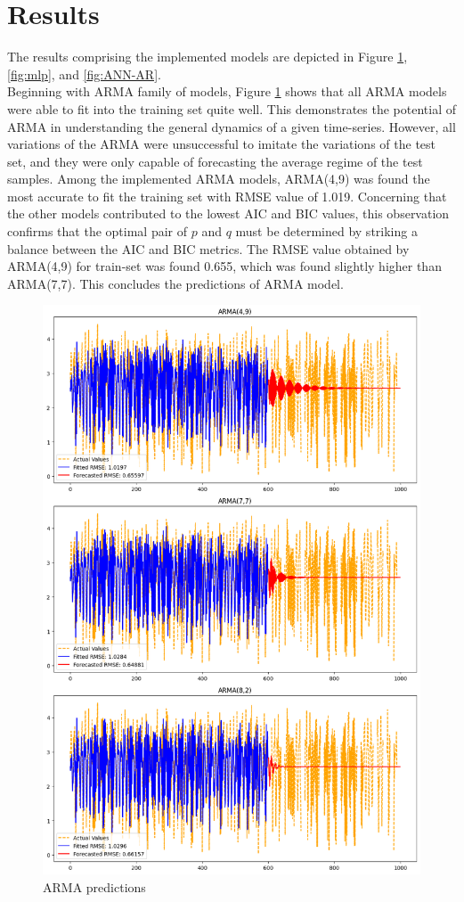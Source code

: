 \documentclass{article}
\begin{document}
\section{Results}
The results comprising the implemented models are depicted in Figure \ref{fig:ARMA}, \ref{fig:mlp}, and \ref{fig:ANN-AR}.\\
Beginning with ARMA family of models, Figure \ref{fig:ARMA} shows that all ARMA models were able to fit into the training set quite well. This demonstrates the potential of ARMA in understanding the general dynamics of a given time-series. However, all variations of the ARMA were unsuccessful to imitate the variations of the test set, and they were only capable of forecasting the average regime of the test samples.
Among the implemented ARMA models, ARMA(4,9) was found the most accurate to fit the training set with RMSE value of 1.019. Concerning that the other models contributed to the lowest AIC and BIC values, this observation confirms that the optimal pair of $p$ and $q$ must be determined by striking a balance between the AIC and BIC metrics. The RMSE value obtained by ARMA(4,9) for train-set was found 0.655, which was found slightly higher than ARMA(7,7). This concludes the predictions of ARMA model.\\
\begin{figure}[h!]
    \centering
    \includegraphics[width=0.75\linewidth]{Fig04.png}
    \caption{\label{fig:ARMA} ARMA predictions}
\end{figure}
\end{document}
